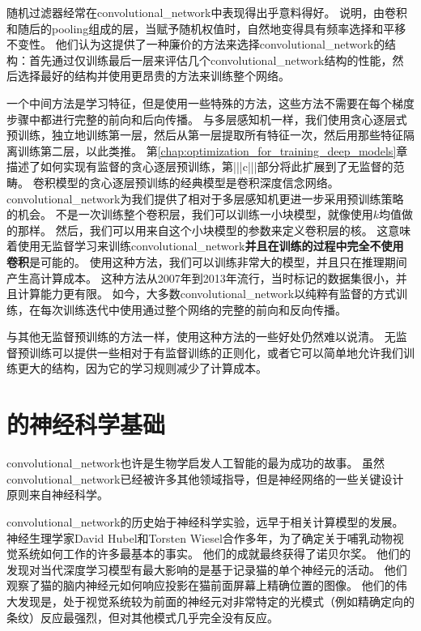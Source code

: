 
随机过滤器经常在\gls{convolutional_network}中表现得出乎意料得好\cite{Jarrett-ICCV2009-small,Saxe-ICML2011,pinto2011scaling,cox2011beyond}。
\cite{Saxe-ICML2011}说明，由卷积和随后的\gls{pooling}组成的层，当赋予随机权值时，自然地变得具有频率选择和平移不变性。
他们认为这提供了一种廉价的方法来选择\gls{convolutional_network}的结构：首先通过仅训练最后一层来评估几个\gls{convolutional_network}结构的性能，然后选择最好的结构并使用更昂贵的方法来训练整个网络。

一个中间方法是学习特征，但是使用一些特殊的方法，这些方法不需要在每个梯度步骤中都进行完整的前向和后向传播。
与多层感知机一样，我们使用贪心逐层式预训练，独立地训练第一层，然后从第一层提取所有特征一次，然后用那些特征隔离训练第二层，以此类推。
第\ref{chap:optimization_for_training_deep_models}章描述了如何实现有监督的贪心逐层预训练，第|||c|||部分将此扩展到了无监督的范畴。
卷积模型的贪心逐层预训练的经典模型是卷积深度信念网络\citep{HonglakL2009}。
\gls{convolutional_network}为我们提供了相对于多层感知机更进一步采用预训练策略的机会。
不是一次训练整个卷积层，我们可以训练一小块模型，就像\cite{Coates2011}使用$k$均值做的那样。
然后，我们可以用来自这个小块模型的参数来定义卷积层的核。
这意味着使用无监督学习来训练\gls{convolutional_network}\textbf{并且在训练的过程中完全不使用卷积}是可能的。
使用这种方法，我们可以训练非常大的模型，并且只在推理期间产生高计算成本\citep{ranzato-cvpr-07-small,Jarrett-ICCV2009-small,koray-nips-10-small,icml2013_coates13}。
这种方法从2007年到2013年流行，当时标记的数据集很小，并且计算能力更有限。
如今，大多数\gls{convolutional_network}以纯粹有监督的方式训练，在每次训练迭代中使用通过整个网络的完整的前向和反向传播。
 
 
与其他无监督预训练的方法一样，使用这种方法的一些好处仍然难以说清。
无监督预训练可以提供一些相对于有监督训练的正则化，或者它可以简单地允许我们训练更大的结构，因为它的学习规则减少了计算成本。

\section{的神经科学基础}
\label{sec:the_neuroscientific_basis_for_convolutional_networks}

\gls{convolutional_network}也许是生物学启发人工智能的最为成功的故事。
虽然\gls{convolutional_network}已经被许多其他领域指导，但是神经网络的一些关键设计原则来自神经科学。

\gls{convolutional_network}的历史始于神经科学实验，远早于相关计算模型的发展。
神经生理学家David Hubel和Torsten Wiesel合作多年，为了确定关于哺乳动物视觉系统如何工作的许多最基本的事实\citep{Hubel+Wiesel-1959,Hubel62,Hubel+Wiesel-1968}。
他们的成就最终获得了诺贝尔奖。
他们的发现对当代深度学习模型有最大影响的是基于记录猫的单个神经元的活动。
他们观察了猫的脑内神经元如何响应投影在猫前面屏幕上精确位置的图像。
他们的伟大发现是，处于视觉系统较为前面的神经元对非常特定的光模式（例如精确定向的条纹）反应最强烈，但对其他模式几乎完全没有反应。

